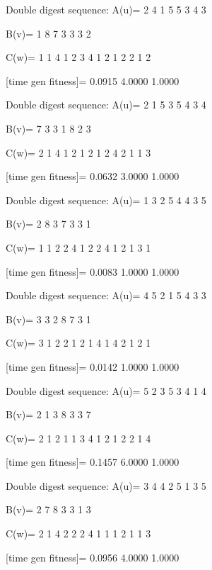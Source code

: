 Double digest sequence:
A(u)=
     2     4     1     5     5     3     4     3

B(v)=
     1     8     7     3     3     3     2

C(w)=
     1     1     4     1     2     3     4     1     2     1     2     2     1     2

[time gen fitness]=
    0.0915    4.0000    1.0000

Double digest sequence:
A(u)=
     2     1     5     3     5     4     3     4

B(v)=
     7     3     3     1     8     2     3

C(w)=
     2     1     4     1     2     1     2     1     2     4     2     1     1     3

[time gen fitness]=
    0.0632    3.0000    1.0000

Double digest sequence:
A(u)=
     1     3     2     5     4     4     3     5

B(v)=
     2     8     3     7     3     3     1

C(w)=
     1     1     2     2     4     1     2     2     4     1     2     1     3     1

[time gen fitness]=
    0.0083    1.0000    1.0000

Double digest sequence:
A(u)=
     4     5     2     1     5     4     3     3

B(v)=
     3     3     2     8     7     3     1

C(w)=
     3     1     2     2     1     2     1     4     1     4     2     1     2     1

[time gen fitness]=
    0.0142    1.0000    1.0000

Double digest sequence:
A(u)=
     5     2     3     5     3     4     1     4

B(v)=
     2     1     3     8     3     3     7

C(w)=
     2     1     2     1     1     3     4     1     2     1     2     2     1     4

[time gen fitness]=
    0.1457    6.0000    1.0000

Double digest sequence:
A(u)=
     3     4     4     2     5     1     3     5

B(v)=
     2     7     8     3     3     1     3

C(w)=
     2     1     4     2     2     2     4     1     1     1     2     1     1     3

[time gen fitness]=
    0.0956    4.0000    1.0000

